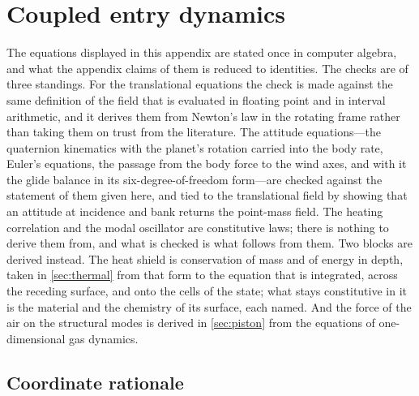 
\section{Coupled entry dynamics}
\label{apx:dyn}

The equations displayed in this appendix are stated once in computer
algebra, and what the appendix claims of them is reduced to identities. The
checks are of three standings. For the translational equations the check is
made against the same definition of the field that is evaluated in
floating point and in interval arithmetic, and it derives them
from Newton's law in the rotating frame rather than taking them on trust
from the literature. The attitude equations---the quaternion kinematics
with the planet's rotation carried into the body rate, Euler's equations,
the passage from the body force to the wind axes, and with it the glide
balance in its six-degree-of-freedom form---are checked against the
statement of them given here, and tied to the translational field by
showing that an attitude at incidence and bank returns the point-mass
field. The heating correlation and the modal oscillator are constitutive
laws; there is nothing to derive them from, and what is checked is what
follows from them. Two blocks are derived instead. The heat shield is
conservation of mass and of energy in depth, taken in \cref{sec:thermal}
from that form to the equation that is integrated, across the receding
surface, and onto the cells of the state; what stays constitutive in it is
the material and the chemistry of its surface, each named. And the force of
the air on the structural modes is derived in \cref{sec:piston} from the
equations of one-dimensional gas dynamics.

\subsection{Coordinate rationale}\label{sec:coord-rationale}

